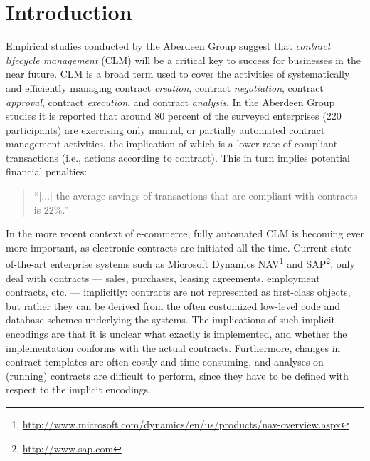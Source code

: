 \documentclass[orivec,final]{llncs-href}
\begin{document}
\section{Introduction}
Empirical studies conducted by the Aberdeen Group
\cite{aberdeen06procurementcontracts,aberdeen07clm} suggest that 
\emph{contract lifecycle management} (CLM) will be a critical key to
success for businesses in the near future. CLM is a broad term used to cover
the activities of systematically and efficiently managing contract
\emph{creation}, contract \emph{negotiation}, contract
\emph{approval}, contract \emph{execution}, and contract
\emph{analysis}. In the Aberdeen Group studies it is
reported that around 80 percent of the surveyed enterprises (220
participants) are exercising only manual, or partially automated
contract management activities, the implication of which is a lower
rate of compliant transactions (i.e., actions according to
contract). This in turn implies potential financial penalties:
\begin{quote}
``[...] the average savings of transactions that are compliant with
contracts is 22\%.'' \cite[p. 1]{aberdeen06procurementcontracts}
\end{quote}

In the more recent context of e-commerce, fully automated CLM is
becoming ever more important, as electronic contracts are initiated
all the time. Current state-of-the-art enterprise systems such as
Microsoft Dynamics
NAV\footnote{\url{http://www.microsoft.com/dynamics/en/us/products/nav-overview.aspx}}
and SAP\footnote{\url{http://www.sap.com}}, only deal with contracts
--- sales, purchases, leasing agreements, employment contracts,
etc. --- implicitly: contracts are not represented as 
first-class objects, but rather they can be derived from the often
customized low-level code and database schemes underlying the
systems. The implications of such implicit encodings are that it is
unclear what exactly is implemented, and whether the
implementation conforms with the actual contracts. Furthermore,
changes in contract templates are often costly and time consuming, and
analyses on (running) contracts are difficult to perform, since they
have to be defined with respect to the implicit encodings.
\end{document}
